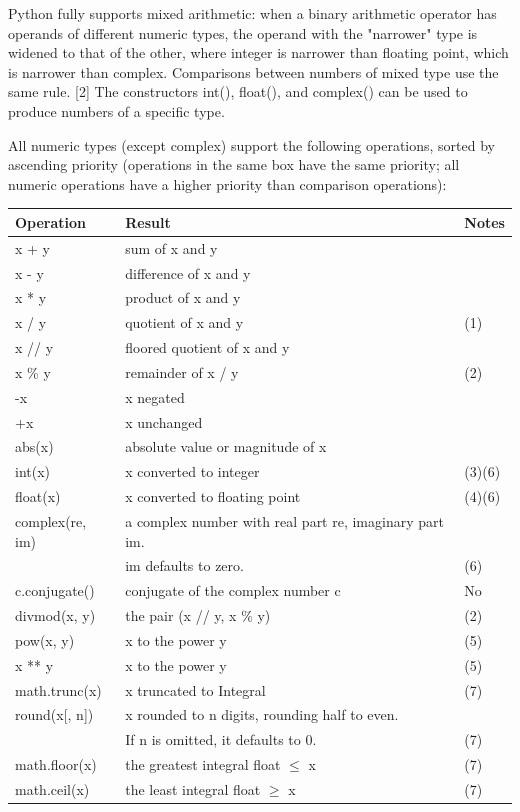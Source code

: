 \vpara
Python fully supports mixed arithmetic: when a binary arithmetic operator has operands of different numeric types, the operand with the "narrower" type is widened to that of the other, where integer is narrower than floating point, which is narrower than complex. Comparisons between numbers of mixed type use the same rule. [2] The constructors int(), float(), and complex() can be used to produce numbers of a specific type.

\vpara
All numeric types (except complex) support the following operations, sorted by ascending priority (operations in the same box have the same priority; all numeric operations have a higher priority than comparison operations):


\begin{table}[ht]
	\centering
	\begin{tabular}{|l|l|l|}
		\hline
		Operation & Result & Notes\\
		\hline
		x + y & sum of x and y &   \\
		x - y & difference of x and y &   \\
		x * y & product of x and y &   \\				
		x / y & quotient of x and y &  (1) \\
		x // y & floored quotient of x and y &  \\
		x \% y & remainder of x / y &  (2) \\				
		-x & x negated &   \\
		+x & x unchanged &   \\
		abs(x) & absolute value or magnitude of x &   \\
		int(x) & x converted to integer &  (3)(6) \\
		float(x) & x converted to floating point &  (4)(6) \\
		complex(re, im) & a complex number with real part re, imaginary part im. &  \\
		 & im defaults to zero. &  (6) \\
		c.conjugate() & conjugate of the complex number c &  No \\
		divmod(x, y) & the pair (x // y, x \% y) &  (2) \\
		pow(x, y)  & x to the power y &  (5) \\
		x ** y &  x to the power y &  (5) \\
		math.trunc(x) &  x truncated to Integral &  (7) \\
		round(x[, n]) &  x rounded to n digits, rounding half to even. & \\
		 & If n is omitted, it defaults to 0. &  (7) \\
		math.floor(x) &  the greatest integral float $\le$ x &  (7) \\
		math.ceil(x) &  the least integral float $\ge$ x &  (7) \\
		\hline
	\end{tabular}
\end{table}
    



